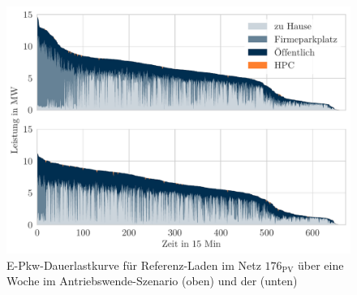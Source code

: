 \begin{figure}[H]
    \centering
    \includegraphics[width=\textwidth]{Bilder/example_load_duration_curve}
    \caption[E-Pkw-Dauerlastkurve für Referenz-Laden im Netz \num{176} über eine Woche im Antriebswende-Szenario und der \SzeFirmenparkplatz]{E-Pkw-Dauerlastkurve für Referenz-Laden im Netz \(176_{\text{PV}}\) über eine Woche im Antriebswende-Szenario (oben) und der \SzeFirmenparkplatz (unten)}\label{fig:example_load_curve}
\end{figure}